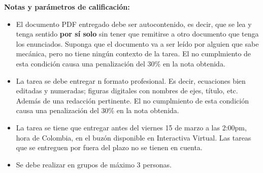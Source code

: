 \documentclass{exam}
\begin{document}
\textbf{Notas y parámetros de calificación:}
\begin{itemize}	
\item El documento PDF entregado debe ser autocontenido, es decir, que se lea y tenga sentido \textbf{por sí solo} sin tener que remitirse a otro documento que tenga los enunciados. Suponga que el documento va a ser leído por alguien que sabe mecánica, pero no tiene ningún contexto de la tarea. El no cumplmiento de esta condición causa una penalización del 30\% en la nota obtenida.

\item La tarea se debe entregar n formato profesional. Es decir, ecuaciones bien editadas y numeradas; figuras digitales con nombres de ejes, título, etc. Además de una redacción pertinente. El no cumplmiento de esta condición causa una penalización del 30\% en la nota obtenida.

\item La tarea se tiene que entregar antes del viernes 15 de marzo a las 2:00pm, hora de Colombia, en el buzón disponible en Interactiva Virtual. Las tareas que se entreguen por fuera del plazo no se tienen en cuenta.

\item Se debe realizar en grupos de máximo 3 personas.
\end{itemize}	
\end{document}
